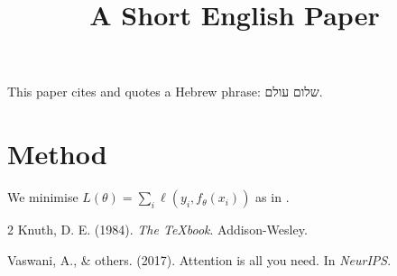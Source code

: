 \documentclass[11pt,a4paper]{article}
\title{A Short English Paper}
\date{}
\begin{document}
\maketitle

This paper cites \citet{knuth1984} and quotes a Hebrew phrase: \foreignlanguage{hebrew}{שלום עולם}.

\section{Method}

We minimise $L(\theta) = \sum_i \ell(y_i, f_\theta(x_i))$ as in \citep{vaswani2017}.

\begin{thebibliography}{2}
 Knuth, D. E. (1984). \emph{The TeXbook}. Addison-Wesley.

 Vaswani, A., \& others. (2017). Attention is all you need. In \emph{NeurIPS}.
\end{thebibliography}
\end{document}
